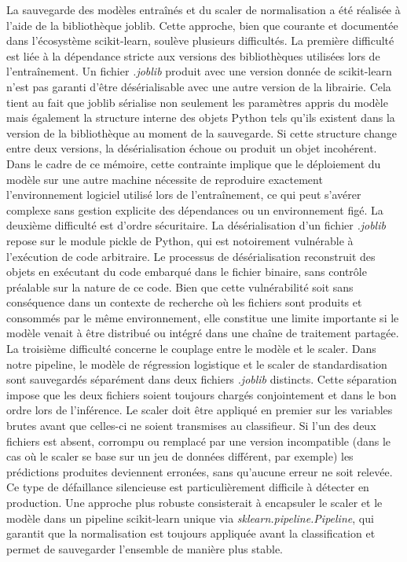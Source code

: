 La sauvegarde des modèles entraînés et du scaler de normalisation a été réalisée
à l'aide de la bibliothèque joblib. Cette approche, bien que courante et documentée dans
l'écosystème scikit-learn, soulève plusieurs difficultés. La première difficulté est liée à la
dépendance stricte aux versions des bibliothèques utilisées lors de
l'entraînement. Un fichier \textit{.joblib} produit avec une version donnée de
scikit-learn n'est pas garanti d'être désérialisable avec une autre version de la librairie.
Cela tient au fait que joblib sérialise non seulement les
paramètres appris du modèle mais également la structure interne des objets
Python tels qu'ils existent dans la version de la bibliothèque au moment de la
sauvegarde. Si cette structure change entre deux versions, la désérialisation
échoue ou produit un objet incohérent. Dans le cadre de ce mémoire,
cette contrainte implique que le déploiement du modèle sur une autre machine
nécessite de reproduire exactement l'environnement logiciel utilisé lors de
l'entraînement, ce qui peut s'avérer complexe sans gestion explicite des
dépendances ou un environnement figé. La
deuxième difficulté est d'ordre sécuritaire. La désérialisation d'un fichier \textit{.joblib}
repose sur le module pickle de Python, qui est notoirement
vulnérable à l'exécution de code arbitraire. Le processus de désérialisation
reconstruit des objets en exécutant du code embarqué dans le fichier
binaire, sans contrôle préalable sur la nature de ce code. Bien que cette
vulnérabilité soit sans conséquence dans un contexte de recherche où les
fichiers sont produits et consommés par le même environnement, elle constitue
une limite importante si le modèle venait à être distribué ou intégré dans une
chaîne de traitement partagée. La troisième difficulté concerne le couplage entre le modèle et le scaler.
Dans notre pipeline, le
modèle de régression logistique et le scaler de standardisation sont sauvegardés
séparément dans deux fichiers \textit{.joblib} distincts. Cette séparation impose que les
deux fichiers soient toujours chargés conjointement et dans le bon ordre lors de
l'inférence. Le scaler doit être appliqué en premier sur les variables brutes avant que
celles-ci ne soient transmises au classifieur. Si l'un des deux fichiers est
absent, corrompu ou remplacé par une version incompatible (dans le cas où le scaler se base sur un jeu de données différent, par exemple)
les prédictions produites deviennent erronées, sans qu'aucune erreur ne soit relevée. Ce type de défaillance
silencieuse est particulièrement difficile à détecter en production. Une approche plus robuste consisterait à encapsuler le scaler et le modèle
dans un pipeline scikit-learn unique via \textit{sklearn.pipeline.Pipeline}, qui garantit que la normalisation est toujours appliquée
avant la classification et permet de sauvegarder l'ensemble de manière plus stable.



